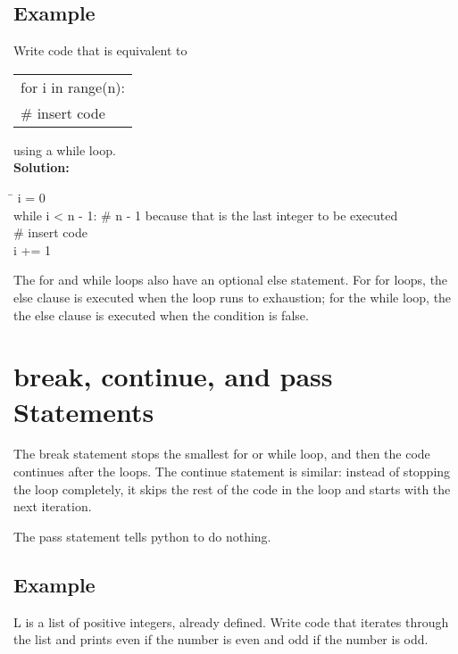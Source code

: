 \documentclass{article}
\newcommand{\icode}[1]{{\ttfamily #1}}
\newenvironment{code}{\begin{tcolorbox}\ttfamily}{\end{tcolorbox}}
\begin{document}
\subsection{Example}
\noindent Write code that is equivalent to 

\begin{center} \ttfamily
	\begin{tabular}{|l}
		for i in range(n):\\
		\hspace{2 em}\# insert code
	\end{tabular}
\end{center}
using a while loop.\\
\noindent\textbf{Solution:}
\begin{code}
	\begin{tabbing}
		\hspace{3.5 in}\=\hspace{3.25 in} \kill
		i = 0\\
		while i < n - 1: \hspace{1 cm}\# n - 1 because that is the last integer to be executed\\
		\hspace{2 em}\# insert code\\
		\hspace{2 em}i += 1
	\end{tabbing}
\end{code}
\vspace{.5 cm}
The \icode{for} and \icode{while} loops also have an optional \icode{else} statement. For \icode{for} loops, the \icode{else} clause is executed when the loop runs to exhaustion; for the \icode{while} loop, the the \icode{else} clause is executed when the condition is false.
\section{\icode{break}, \icode{continue}, and \icode{pass} Statements}
The \icode{break} statement stops the smallest \icode{for} or \icode{while} loop, and then the code continues after the loops. The \icode{continue} statement is similar: instead of stopping the loop completely, it skips the rest of the code in the loop and starts with the next iteration.

The \icode{pass} statement tells python to do nothing.

\subsection{Example}
\icode{L} is a list of positive integers, already defined. Write code that iterates through the list and prints \icode{even} if the number is even and \icode{odd} if the number is odd.
\end{document}
